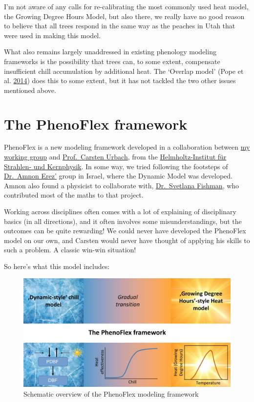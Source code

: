 \documentclass[
]{book}
\begin{document}
I'm not aware of any calls for re-calibrating the most commonly used heat model, the Growing Degree Hours Model, but also there, we really have no good reason to believe that all trees respond in the same way as the peaches in Utah that were used in making this model.

What also remains largely unaddressed in existing phenology modeling frameworks is the possibility that trees can, to some extent, compensate insufficient chill accumulation by additional heat. The `Overlap model' (Pope et al. \protect\hyperlink{ref-pope2014biologically}{2014}) does this to some extent, but it has not tackled the two other issues mentioned above.

\hypertarget{the-phenoflex-framework}{%
\section{The PhenoFlex framework}\label{the-phenoflex-framework}}

PhenoFlex is a new modeling framework developed in a collaboration between \href{http://www.hortibonn.de}{my working group} and \href{https://scholar.google.de/citations?user=M6cyw30AAAAJ\&hl=de}{Prof.~Carsten Urbach}, from the \href{https://www.hiskp.uni-bonn.de/index.php?id=74\&L=1}{Helmholtz-Institut für Strahlen- und Kernphysik}. In some way, we tried following the footsteps of \href{https://scholar.google.com/citations?user=sh6vJt0AAAAJ\&hl=en}{Dr.~Amnon Erez'} group in Israel, where the Dynamic Model was developed. Amnon also found a physicist to collaborate with, \href{https://www.researchgate.net/profile/Svetlana_Fishman}{Dr.~Svetlana Fishman}, who contributed most of the maths to that project.

Working across disciplines often comes with a lot of explaining of disciplinary basics (in all directions), and it often involves some misunderstandings, but the outcomes can be quite rewarding! We could never have developed the PhenoFlex model on our own, and Carsten would never have thought of applying his skills to such a problem. A classic win-win situation!

So here's what this model includes:

\begin{figure}
\centering
\includegraphics{pictures/PhenoFlex_concept.jpg}
\caption{Schematic overview of the PhenoFlex modeling framework}
\end{figure}
\end{document}

